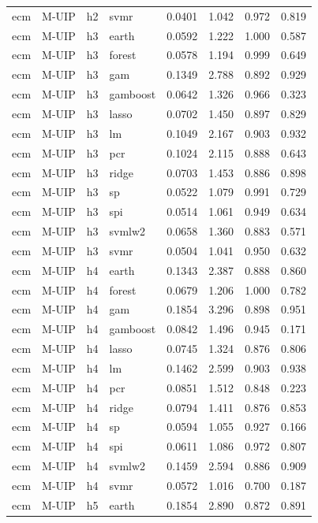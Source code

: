 \begin{ThreePartTable}
\begin{longtable}[t]{llclcccc}
ecm & M-UIP & h2 & svmr & 0.0401 & 1.042 & 0.972 & 0.819\\
\addlinespace
ecm & M-UIP & h3 & earth & 0.0592 & 1.222 & 1.000 & 0.587\\
ecm & M-UIP & h3 & forest & 0.0578 & 1.194 & 0.999 & 0.649\\
ecm & M-UIP & h3 & gam & 0.1349 & 2.788 & 0.892 & 0.929\\
ecm & M-UIP & h3 & gamboost & 0.0642 & 1.326 & 0.966 & 0.323\\
ecm & M-UIP & h3 & lasso & 0.0702 & 1.450 & 0.897 & 0.829\\
ecm & M-UIP & h3 & lm & 0.1049 & 2.167 & 0.903 & 0.932\\
ecm & M-UIP & h3 & pcr & 0.1024 & 2.115 & 0.888 & 0.643\\
ecm & M-UIP & h3 & ridge & 0.0703 & 1.453 & 0.886 & 0.898\\
ecm & M-UIP & h3 & sp & 0.0522 & 1.079 & 0.991 & 0.729\\
ecm & M-UIP & h3 & spi & 0.0514 & 1.061 & 0.949 & 0.634\\
ecm & M-UIP & h3 & svmlw2 & 0.0658 & 1.360 & 0.883 & 0.571\\
ecm & M-UIP & h3 & svmr & 0.0504 & 1.041 & 0.950 & 0.632\\
\addlinespace
ecm & M-UIP & h4 & earth & 0.1343 & 2.387 & 0.888 & 0.860\\
ecm & M-UIP & h4 & forest & 0.0679 & 1.206 & 1.000 & 0.782\\
ecm & M-UIP & h4 & gam & 0.1854 & 3.296 & 0.898 & 0.951\\
ecm & M-UIP & h4 & gamboost & 0.0842 & 1.496 & 0.945 & 0.171\\
ecm & M-UIP & h4 & lasso & 0.0745 & 1.324 & 0.876 & 0.806\\
ecm & M-UIP & h4 & lm & 0.1462 & 2.599 & 0.903 & 0.938\\
ecm & M-UIP & h4 & pcr & 0.0851 & 1.512 & 0.848 & 0.223\\
ecm & M-UIP & h4 & ridge & 0.0794 & 1.411 & 0.876 & 0.853\\
ecm & M-UIP & h4 & sp & 0.0594 & 1.055 & 0.927 & 0.166\\
ecm & M-UIP & h4 & spi & 0.0611 & 1.086 & 0.972 & 0.807\\
ecm & M-UIP & h4 & svmlw2 & 0.1459 & 2.594 & 0.886 & 0.909\\
ecm & M-UIP & h4 & svmr & 0.0572 & 1.016 & 0.700 & 0.187\\
\addlinespace
ecm & M-UIP & h5 & earth & 0.1854 & 2.890 & 0.872 & 0.891\\

\end{longtable}
\end{ThreePartTable}

